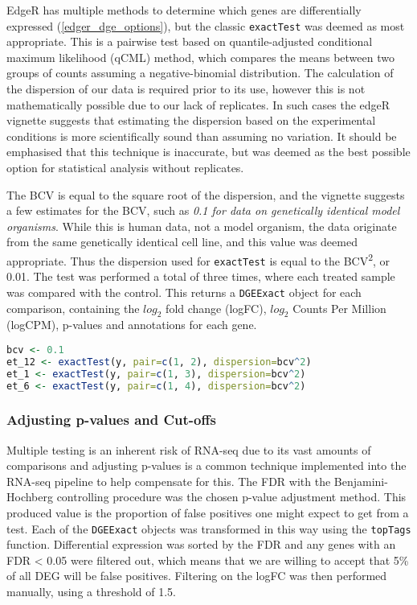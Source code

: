 EdgeR has multiple methods to determine which genes are differentially expressed (\autoref{edger_dge_options}), but the classic \texttt{exactTest} was deemed as most appropriate. This is a pairwise test based on quantile-adjusted conditional maximum likelihood (qCML) method, which compares the means between two groups of counts assuming a negative-binomial distribution. The calculation of the dispersion of our data is required prior to its use, however this is not mathematically possible due to our lack of replicates. In such cases the edgeR vignette suggests that estimating the dispersion based on the experimental conditions is more scientifically sound than assuming no variation. It should be emphasised that this technique is inaccurate, but was deemed as the best possible option for statistical analysis without replicates.

The \ac{BCV} is equal to the square root of the dispersion, and the vignette suggests a few estimates for the \ac{BCV}, such as \textit{0.1 for data on genetically identical model organisms}. While this is human data, not a model organism, the data originate from the same genetically identical cell line, and this value was deemed appropriate. Thus the dispersion used for \texttt{exactTest} is equal to the BCV\textsuperscript{2}, or 0.01. 
The test was performed a total of three times, where each treated sample was compared with the control. This returns a \texttt{DGEExact} object for each comparison, containing the $log_{2}$ fold change (logFC), $log_{2}$ Counts Per Million (logCPM), p-values and annotations for each gene. 

\begin{lstlisting}[language=R, caption=Exact test function]
bcv <- 0.1
et_12 <- exactTest(y, pair=c(1, 2), dispersion=bcv^2)
et_1 <- exactTest(y, pair=c(1, 3), dispersion=bcv^2)
et_6 <- exactTest(y, pair=c(1, 4), dispersion=bcv^2)
\end{lstlisting}

\subsubsection{Adjusting p-values and Cut-offs}

Multiple testing is an inherent risk of RNA-seq due to its vast amounts of comparisons and adjusting p-values is a common technique implemented into the RNA-seq pipeline to help compensate for this.  The \ac{FDR} with the Benjamini-Hochberg controlling procedure \citep{benjamini1995controlling} was the chosen p-value adjustment method. This produced value is the proportion of false positives one might expect to get from a test. Each of the \texttt{DGEExact} objects was transformed in this way using the \texttt{topTags} function. Differential expression was sorted by the \ac{FDR} and any genes with an \ac{FDR} < 0.05 were filtered out, which means that we are willing to accept that 5\% of all \ac{DEG} will be false positives. Filtering on the \ac{logFC} was then performed manually, using a threshold of 1.5.  

